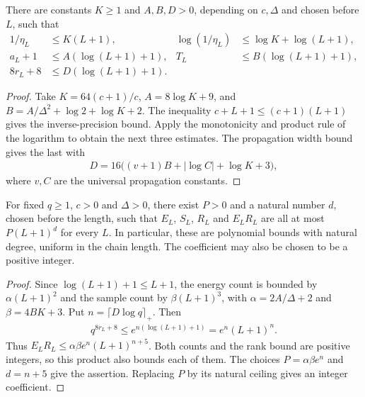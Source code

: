 \begin{lemma}
    \label{thm:huang_filter_logarithmic_growth}
    \leanok
    There are constants $K\ge1$ and $A,B,D>0$, depending on $c,\Delta$ and
    chosen before $L$, such that
    \begin{align}
        1/\eta_L       & \le K(L+1),          &
        \log(1/\eta_L) & \le\log K+\log(L+1),   \\
        a_L+1          & \le A(\log(L+1)+1),  &
        T_L            & \le B(\log(L+1)+1),    \\
        8r_L+8         & \le D(\log(L+1)+1).
    \end{align}
\end{lemma}
\begin{proof}
    \leanok
    Take $K=64(c+1)/c$, $A=8\log K+9$, and
    $B=A/\Delta^2+\log2+\log K+2$. The inequality
    $c+L+1\le(c+1)(L+1)$ gives the inverse-precision bound. Apply the
    monotonicity and product rule of the logarithm to obtain the next three
    estimates. The propagation width bound gives the last with
    \begin{align}
        D=16\bigl((v+1)B+|\log C|+\log K+3\bigr),
    \end{align}
    where $v,C$ are the universal propagation constants.
\end{proof}

\begin{lemma}
    \label{thm:huang_filter_uniform_polynomial}
    \leanok
    For fixed $q\ge1$, $c>0$ and $\Delta>0$, there exist $P>0$ and a natural
    number $d$, chosen before the length, such that $E_L$, $S_L$, $R_L$ and
    $E_LR_L$ are all at most $P(L+1)^d$ for every $L$. In particular, these
    are polynomial bounds with natural degree, uniform in the chain length.
    The coefficient may also be chosen to be a positive integer.
\end{lemma}
\begin{proof}
    \leanok
    Since $\log(L+1)+1\le L+1$, the energy count is bounded by
    $\alpha(L+1)^2$ and the sample count by $\beta(L+1)^3$, with
    $\alpha=2A/\Delta+2$ and $\beta=4BK+3$.
    Put $n=\lceil D\log q\rceil_+$. Then
    \begin{align}
        q^{8r_L+8}
        \le e^{n(\log(L+1)+1)}=e^n(L+1)^n.
    \end{align}
    Thus $E_LR_L\le\alpha\beta e^n(L+1)^{n+5}$. Both counts and the rank
    bound are positive integers, so this product also bounds each of them.
    The choices $P=\alpha\beta e^n$ and $d=n+5$ give the assertion.
    Replacing $P$ by its natural ceiling gives an integer coefficient.
\end{proof}

